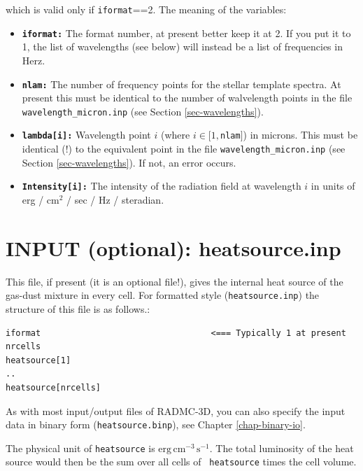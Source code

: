 \documentclass{report}
\newenvironment{asciibox}%
  {\begin{list}{}{%
    \setlength{\topsep}{0.5em}%
    \setlength{\parskip}{0em}%
    \setlength{\parsep}{0em}%
    \setlength{\itemsep}{0em}%
    \setlength{\rightmargin}{0em}%
    \setlength{\leftmargin}{3.0em}%
    \setlength{\labelsep}{1em}%
    \setlength{\labelwidth}{2em}%
  }\normalfont\footnotesize\item}
  {\end{list}}
\begin{document}
which is valid only if {\small\tt iformat}==2. The meaning of the variables:
\begin{itemize}
\item[] {\small\tt\bf iformat:} The format number, at present better keep it at 2. 
  If you put it to 1, the list of wavelengths (see below) will instead be
  a list of frequencies in Herz. 
\item[] {\small\tt\bf nlam:} The number of frequency points for the stellar
  template spectra. At present this must be identical to the number of
  walvelength points in the file {\small\tt wavelength\_micron.inp} (see
  Section \ref{sec-wavelengths}).
\item[] {\small\tt\bf lambda[i]:} Wavelength point $i$ (where $i\in
  [1,${\small\tt nlam}$]$) in microns. This must be identical (!) to the
  equivalent point in the file {\small\tt wavelength\_micron.inp} (see
  Section \ref{sec-wavelengths}). If not, an error occurs.
\item[] {\small\tt\bf Intensity[i]:} The intensity of the radiation field at
  wavelength $i$ in units of erg / cm$^2$ / sec / Hz / steradian.
\end{itemize}


\section{INPUT (optional): heatsource.inp}
\label{sec-heatsource}
%
This file, if present (it is an optional file!), gives the internal heat
source of the gas-dust mixture in every cell. For formatted style
({\small\tt heatsource.inp}) the structure of this file is as follows.:
\begin{asciibox}\begin{verbatim}
iformat                                  <=== Typically 1 at present
nrcells
heatsource[1]
..
heatsource[nrcells]
\end{verbatim}\end{asciibox}
As with most input/output files of RADMC-3D, you can also specify the input
data in binary form ({\small\tt heatsource.binp}), see Chapter
\ref{chap-binary-io}.

The physical unit of {\small\tt heatsource} is
$\mathrm{erg}\,\mathrm{cm}^{-3}\,\mathrm{s}^{-1}$. The total luminosity of
the heat source would then be the sum over all cells of {\small\tt
  heatsource} times the cell volume. 
\end{document}
